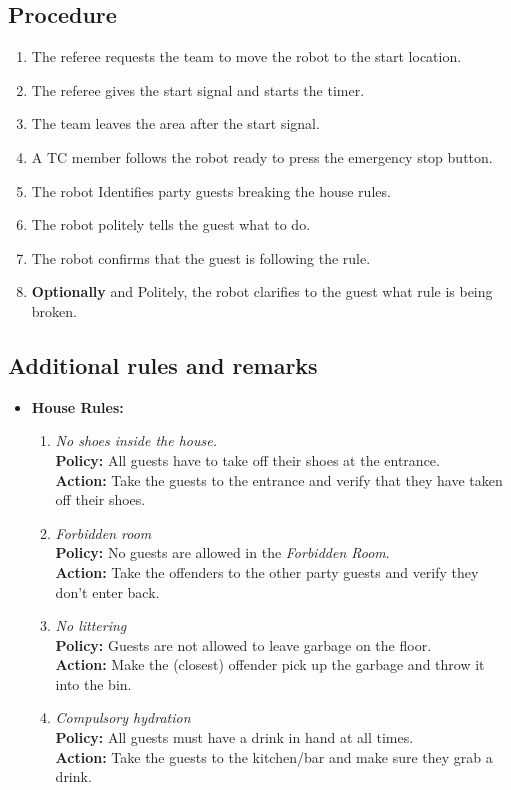\subsection*{Procedure}
	\begin{enumerate}[nosep]
		\item The referee requests the team to move the robot to the start location.
		\item The referee gives the start signal and starts the timer.
		\item The team leaves the area after the start signal.		
		\item A TC member follows the robot ready to press the emergency stop button.
		\item The robot Identifies party guests breaking the house rules.
		\item The robot politely tells the guest what to do. 
		\item The robot confirms that the guest is following the rule.	
		\item \textbf{Optionally} and Politely, the robot clarifies to the guest what rule is being broken.
	\end{enumerate}


\subsection*{Additional rules and remarks}
\begin{itemize}[nosep]
	\item \textbf{House Rules:}
	\begin{enumerate}[nosep]
		\item \textit{No shoes inside the house.}\\
		\textbf{Policy:} All guests have to take off their shoes at the entrance.\\
		\textbf{Action:} Take the guests to the entrance and verify that they have taken off their shoes.
	
		\item \textit{Forbidden room}\\
		\textbf{Policy:} No guests are allowed in the \emph{Forbidden Room}. \\
		\textbf{Action:} Take the offenders to the other party guests and verify they don't enter back.
	
		\item \textit{No littering}\\
		\textbf{Policy:} Guests are not allowed to leave garbage on the floor.\\
		\textbf{Action:} Make the (closest) offender pick up the garbage and throw it into the bin.
	
		\item \textit{Compulsory hydration}\\
		\textbf{Policy:} All guests must have a drink in hand at all times.\\
		\textbf{Action:} Take the guests to the kitchen/bar and make sure they grab a drink.
	\end{enumerate}
\end{itemize}

